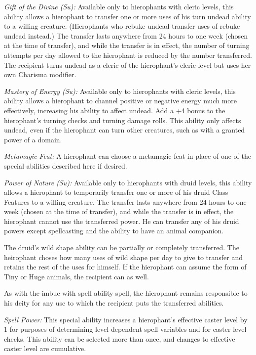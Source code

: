 {\textit{Gift of the Divine (Su):} Available only to hierophants with cleric levels, this ability allows a hierophant to transfer one or more uses of his turn undead ability to a willing creature. (Hierophants who rebuke undead transfer uses of rebuke undead instead.) The transfer lasts anywhere from 24 hours to one week (chosen at the time of transfer), and while the transfer is in effect, the number of turning attempts per day allowed to the hierophant is reduced by the number transferred. The recipient turns undead as a cleric of the hierophant’s cleric level but uses her own Charisma modifier.

\textit{Mastery of Energy (Su):} Available only to hierophants with cleric levels, this ability allows a hierophant to channel positive or negative energy much more effectively, increasing his ability to affect undead. Add a +4 bonus to the hierophant’s turning checks and turning damage rolls. This ability only affects undead, even if the hierophant can turn other creatures, such as with a granted power of a domain.

\textit{Metamagic Feat:} A hierophant can choose a metamagic feat in place of one of the special abilities described here if desired.

\textit{Power of Nature (Su):} Available only to hierophants with druid levels, this ability allows a hierophant to temporarily transfer one or more of his druid Class Features to a willing creature. The transfer lasts anywhere from 24 hours to one week (chosen at the time of transfer), and while the transfer is in effect, the hierophant cannot use the transferred power. He can transfer any of his druid powers except spellcasting and the ability to have an animal companion.

The druid’s wild shape ability can be partially or completely transferred. The heirophant choses how many uses of wild shape per day to give to transfer and retains the rest of the uses for himself. If the hierophant can assume the form of Tiny or Huge animals, the recipient can as well.

As with the imbue with spell ability spell, the hierophant remains responsible to his deity for any use to which the recipient puts the transferred abilities.

\textit{Spell Power:} This special ability increases a hierophant’s effective caster level by 1 for purposes of determining level-dependent spell variables and for caster level checks. This ability can be selected more than once, and changes to effective caster level are cumulative.

}
